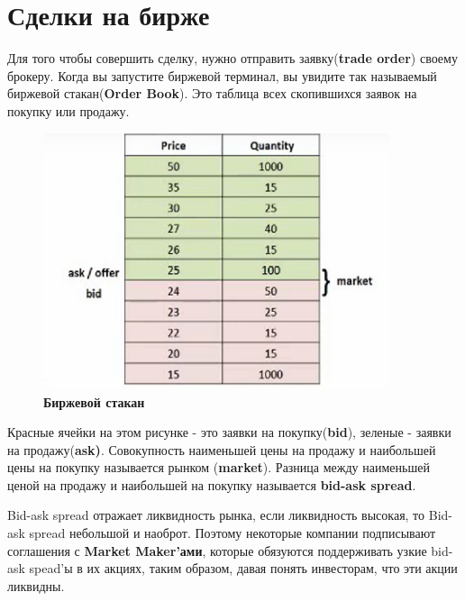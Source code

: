 \documentclass{article}
\begin{document}
 \section{Сделки на бирже}
 Для того чтобы совершить сделку, нужно отправить заявку(\textbf{trade order}) своему брокеру. Когда вы запустите биржевой терминал, вы увидите так называемый биржевой стакан(\textbf{Order Book}). Это таблица всех скопившихся заявок на покупку или продажу.
 \begin{figure}[h]
    \centering
   

\includegraphics[width=4in,keepaspectratio]{bid ask.png}
\begin{center}
   \caption{\textbf{Биржевой стакан}} 
\end{center}
\end{figure}

 Красные ячейки на этом рисунке - это заявки на покупку(\textbf{bid}), зеленые - заявки на продажу(\textbf{ask)}. Совокупность наименьшей цены на продажу и наибольшей цены на покупку называется рынком (\textbf{market}). Разница между наименьшей ценой на продажу и наибольшей на покупку называется \textbf{bid-ask spread}.
 
 Bid-ask spread отражает ликвидность рынка, если ликвидность высокая, то Bid-ask spread небольшой и наоброт. Поэтому некоторые компании подписывают соглашения с \textbf{Market Maker'ами}, которые обязуются поддерживать узкие bid-ask spead'ы  в их акциях, таким образом, давая понять инвесторам, что эти акции ликвидны.
 
\end{document}
